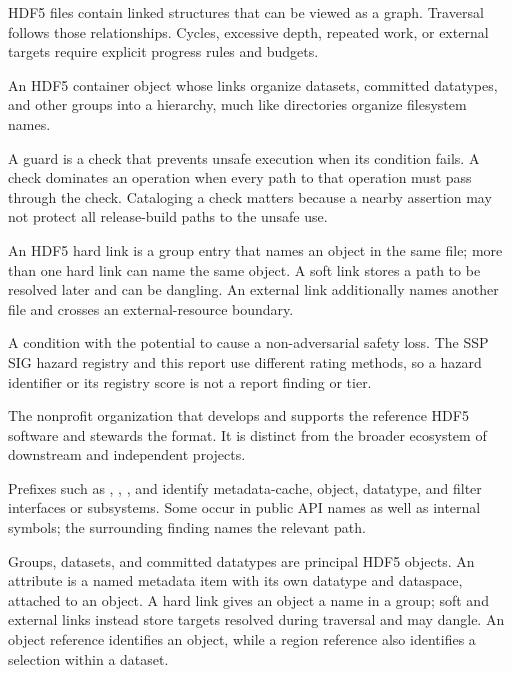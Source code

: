 \documentclass[../main.tex]{subfiles}
\begin{document}
\begin{description}[leftmargin=1.5em,style=nextline]
\item[Graph / traversal.]
HDF5 files contain linked structures that can be viewed as a graph. Traversal
follows those relationships. Cycles, excessive depth, repeated work, or
external targets require explicit progress rules and budgets.

\item[Group.]
An HDF5 container object whose links organize datasets, committed datatypes,
and other groups into a hierarchy, much like directories organize filesystem
names.

\item[Guard / dominating check.]
A guard is a check that prevents unsafe execution when its condition fails. A
check dominates an operation when every path to that operation must pass
through the check. Cataloging a check matters because a nearby assertion may
not protect all release-build paths to the unsafe use.

\item[Hard link / soft link.]
An HDF5 hard link is a group entry that names an object in the same file; more
than one hard link can name the same object. A soft link stores a path to be
resolved later and can be dangling. An external link additionally names another
file and crosses an external-resource boundary.

\item[Hazard.]
A condition with the potential to cause a non-adversarial safety loss. The SSP
SIG hazard registry and this report use different rating methods, so a hazard
identifier or its registry score is not a report finding or tier.

\item[HDF Group, The.]
The nonprofit organization that develops and supports the reference HDF5
software and stewards the format. It is distinct from the broader ecosystem of
downstream and independent projects.

\item[HDF5 interface and subsystem prefixes.]
Prefixes such as , , , and  identify
metadata-cache, object, datatype, and filter interfaces or subsystems. Some
occur in public API names as well as internal symbols; the surrounding finding
names the relevant path.

\item[HDF5 object / attribute / link / reference.]
Groups, datasets, and committed datatypes are principal HDF5 objects. An
attribute is a named metadata item with its own datatype and dataspace, attached
to an object. A hard link gives an object a name in a group; soft and external
links instead store targets resolved during traversal and may dangle. An object
reference identifies an object, while a region reference also identifies a
selection within a dataset.


\end{description}
\end{document}
